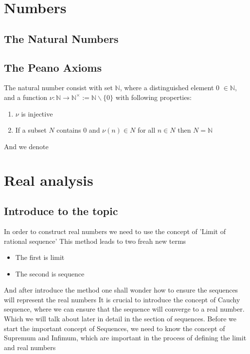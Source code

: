 \documentclass{article}
\newcommand{\N}{\mathbb{N}}
\begin{document}
\section{Numbers}
\subsection{The Natural Numbers}
\subsection{The Peano Axioms}
The natural number consist with set $\N$, where a distinguished element 0 $\in \N$, and a function $\nu : \N \to \N^{\times}:=\N \backslash \{0\}$ with following properties:
\begin{enumerate}
	\item $\nu$ is injective
	\item If a subset $N$ contains 0 and $\nu(n)\in N$ for all $n\in N$ then $N=\N$ 
\end{enumerate}

And we denote 






\section{Real analysis}
\subsection{Introduce to the topic}
In order to construct real numbers we need to use the concept of 'Limit of rational sequence'
This method leads to two freah new terms 
\begin{itemize}
  \item The first is limit
  \item The second is sequence
\end{itemize}
And after introduce the method one shall wonder how to ensure the sequences will represent the real numbers
It is crucial to introduce the concept of Cauchy sequence, where we can ensure that the sequence will converge to a real number.
Which we will talk about later in detail in the section of sequences.
Before we start the important concept of Sequences, we need to know the concept of Supremum and Infimum, which are important in the process of defining the limit and real numbers
\end{document}
